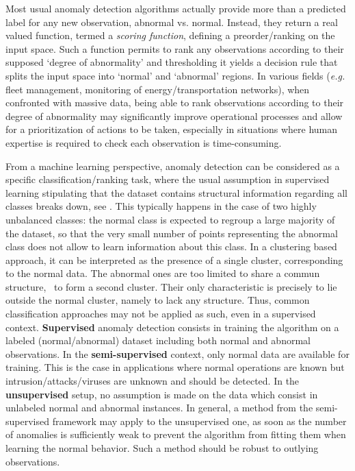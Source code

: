  Most usual anomaly detection algorithms actually
provide more than a predicted label for any new observation, abnormal vs. normal. Instead,
they return a real valued function,  termed a \textit{scoring function}, defining a preorder/ranking on the input space. Such a function permits to rank any observations according to their supposed `degree of abnormality' and thresholding it yields a decision rule that splits the input space into `normal' and `abnormal' regions.
In various fields (\textit{e.g.} fleet management, monitoring of energy/transportation networks), when confronted with massive data, being able to rank observations according to their degree of abnormality may significantly improve operational processes and allow for a prioritization of actions to be taken, especially in situations where human expertise is required to check each observation is time-consuming.


From a machine learning perspective, anomaly detection can be considered as a specific classification/ranking task, where the usual assumption in supervised learning stipulating that the dataset contains structural information regarding all classes breaks down, see \cite{Roberts99}. This typically happens in the case of two highly unbalanced classes: the normal class is expected to regroup a large majority of the dataset, so that the very small number of points representing the abnormal class does not allow to learn information about this class.
In a clustering based approach, it can be
interpreted as the presence of a single cluster, corresponding to the
normal data. The abnormal ones are too limited to share a commun
structure, \ie~to form a second cluster. Their only characteristic is
precisely to lie outside the normal cluster, namely to lack any
structure.  Thus, common classification approaches may not be applied
as such, even in a supervised
context. %
\textbf{Supervised} anomaly detection consists in training the algorithm on a labeled (normal/abnormal) dataset including both normal and abnormal observations. In the \textbf{semi-supervised} context, only normal data are available for training. This is the case in applications where normal operations are known but intrusion/attacks/viruses are unknown and should be detected. In the \textbf{unsupervised} setup, no assumption is made on the data which consist in unlabeled normal and abnormal instances. In general, a method from the semi-supervised framework may apply to the unsupervised one, as soon as the number of anomalies is sufficiently weak to prevent the algorithm from fitting them when learning the normal behavior. Such a method should be robust to outlying observations.


